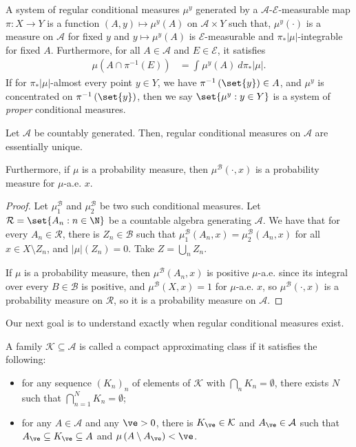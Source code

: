 \documentclass[10pt]{mypackage}
\begin{document}
\begin{definition}
  A system of regular conditional measures $\mu^y$ generated by a $\mathcal{A}$-$\mathcal{E}$-measurable map $\pi\colon X\to Y$ is a function $\left( A,y \right)\mapsto \mu^y(A)$ on $\mathcal{A}\times Y$ such that, $\mu^y(\cdot)$ is a measure on $\mathcal{A}$ for fixed $y$ and $y\mapsto \mu^y(A)$ is $\mathcal{E}$-measurable and $\pi_{\ast}\left\vert \mu \right\vert$-integrable for fixed $A$. Furthermore, for all $A\in \mathcal{A}$ and $E\in \mathcal{E}$, it satisfies
  \begin{align*}
    \mu\left( A\cap \pi^{-1}\left( E \right) \right) &= \int_{}^{} \mu^{y}(A)\:d\pi_{\ast}\left\vert \mu \right\vert.
  \end{align*}
  If for $\pi_{\ast}\left\vert \mu \right\vert$-almost every point $y\in Y$, we have $\pi^{-1}\left(\set{y}\right)\in A$, and $\mu^{y}$ is concentrated on $\pi^{-1}\left( \set{y} \right)$, then we say $\set{\mu^y : y\in Y}$ is a system of \textit{proper} conditional measures.
\end{definition}
\begin{lemma}
  Let $\mathcal{A}$ be countably generated. Then, regular conditional measures on $\mathcal{A}$ are essentially unique.

  Furthermore, if $\mu$ is a probability measure, then $\mu^{\mathcal{B}}\left( \cdot,x \right)$ is a probability measure for $\mu$-a.e. $x$. 
\end{lemma}
\begin{proof}
  Let $\mu_1^{\mathcal{B}}$ and $\mu_2^{\mathcal{B}}$ be two such conditional measures. Let $\mathcal{R} = \set{A_n : n\in \N}$ be a countable algebra generating $\mathcal{A}$. We have that for every $A_n\in \mathcal{R}$, there is $Z_n\in \mathcal{B}$ such that $\mu_1^{\mathcal{B}}\left( A_n,x \right) = \mu_2^{\mathcal{B}}\left( A_n,x \right)$ for all $x\in X\setminus Z_n$, and $\left\vert \mu \right\vert \left( Z_n \right) = 0$. Take $Z = \bigcup_{n}Z_n$.

  If $\mu$ is a probability measure, then $\mu^{\mathcal{B}}\left( A_n,x \right)$ is positive $\mu$-a.e. since its integral over every $B\in \mathcal{B}$ is positive, and $\mu^{\mathcal{B}}\left( X,x \right) = 1$ for $\mu$-a.e. $x$, so $\mu^{\mathcal{B}}\left( \cdot,x \right)$ is a probability measure on $\mathcal{R}$, so it is a probability measure on $\mathcal{A}$.
\end{proof}
Our next goal is to understand exactly when regular conditional measures exist.
\begin{definition}
  A family $\mathcal{K}\subseteq \mathcal{A}$ is called a compact approximating class if it satisfies the following:
  \begin{itemize}
    \item for any sequence $\left( K_n \right)_n$ of elements of $\mathcal{K}$ with $\bigcap_{n} K_n = \emptyset$, there exists $N$ such that $\bigcap_{n=1}^{N} K_n = \emptyset$;
    \item for any $A\in \mathcal{A}$ and any $\ve > 0$, there is $K_{\ve}\in \mathcal{K}$ and $A_{\ve}\in \mathcal{A}$ such that $A_{\ve}\subseteq K_{\ve}\subseteq A$ and $\mu\left( A\setminus A_{\ve} \right) < \ve$.
  \end{itemize}
\end{definition}
\end{document}
